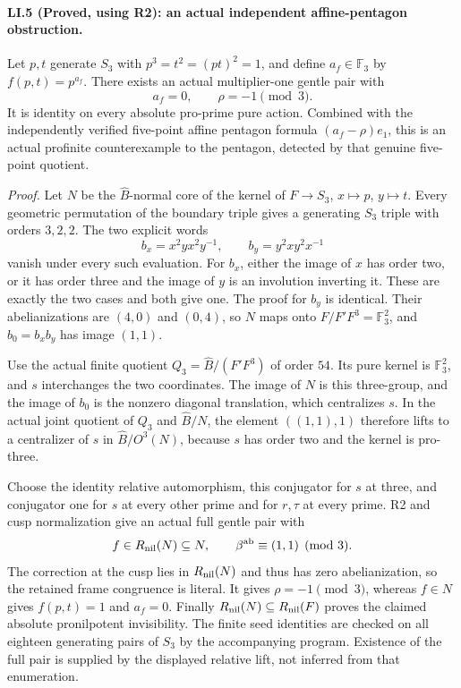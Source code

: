 \paragraph{LI.5 (Proved, using R2): an actual independent affine-pentagon obstruction.}
Let $p,t$ generate $S_3$ with $p^3=t^2=(pt)^2=1$, and define
$a_f\in\mathbb F_3$ by $f(p,t)=p^{a_f}$.
There exists an actual multiplier-one gentle pair with
\[
                  a_f=0,\qquad \rho=-1\pmod3.
\]
It is identity on every absolute pro-prime pure action. Combined
with the independently verified five-point affine pentagon formula
$(a_f-\rho)e_1$, this is an actual profinite counterexample to the
pentagon, detected by that genuine five-point quotient.

\emph{Proof.}
Let $N$ be the $\widehat B$-normal core of the kernel of
$F\to S_3$, $x\mapsto p$, $y\mapsto t$. Every geometric
permutation of the boundary triple gives a generating $S_3$
triple with orders $3,2,2$. The two explicit words
\[
 b_x=x^2yx^2y^{-1},\qquad b_y=y^2xy^2x^{-1}
\]
vanish under every such evaluation. For $b_x$, either the image
of $x$ has order two, or it has order three and the image of $y$
is an involution inverting it. These are exactly the two cases
and both give one. The proof for $b_y$ is identical. Their
abelianizations are $(4,0)$ and $(0,4)$, so $N$ maps onto
$F/F'F^3=\mathbb F_3^2$, and $b_0=b_xb_y$ has image $(1,1)$.

Use the actual finite quotient $Q_3=\widehat B/(F'F^3)$ of
order $54$. Its pure kernel is $\mathbb F_3^2$, and $s$
interchanges the two coordinates. The image of $N$ is this
three-group, and the image of $b_0$ is the nonzero diagonal
translation, which centralizes $s$.
In the actual joint quotient of $Q_3$ and $\widehat B/N$,
the element $((1,1),1)$ therefore lifts to a centralizer of $s$
in $\widehat B/O^3(N)$, because $s$ has order two and the
kernel is pro-three.

Choose the identity relative automorphism, this conjugator
for $s$ at three, and conjugator one for $s$ at every other
prime and for $r,\tau$ at every prime. R2 and cusp normalization
give an actual full gentle pair with
\[
 f\in R_{\rm nil}(N)\subseteq N,\qquad
 \beta^{\rm ab}\equiv(1,1)\pmod3.
\]
The correction at the cusp lies in $R_{\rm nil}(N)$ and thus
has zero abelianization, so the retained frame congruence is
literal. It gives $\rho=-1\pmod3$, whereas $f\in N$ gives
$f(p,t)=1$ and $a_f=0$. Finally
$R_{\rm nil}(N)\subseteq R_{\rm nil}(F)$ proves the claimed
absolute pronilpotent invisibility. The finite seed identities
are checked on all eighteen generating pairs of $S_3$ by the
accompanying program. Existence of the full pair is supplied
by the displayed relative lift, not inferred from that enumeration.

